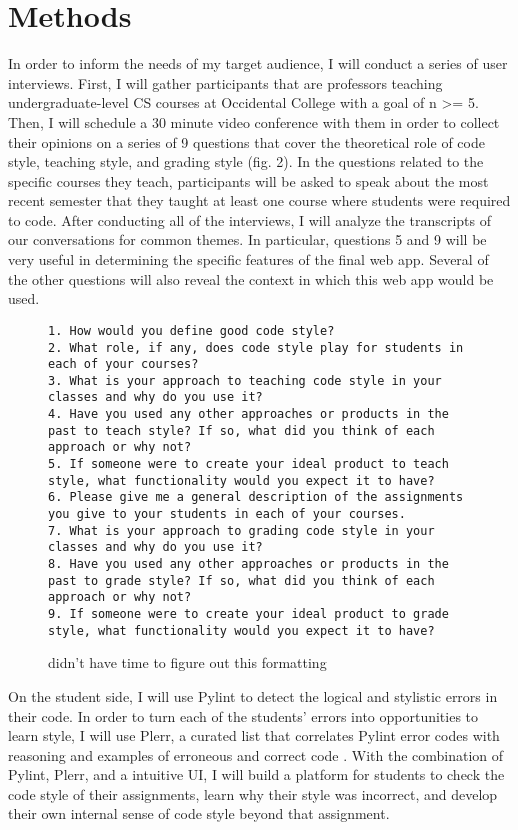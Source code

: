 \documentclass[10pt,twocolumn]{article}
\begin{document}
\section{Methods}
In order to inform the needs of my target audience, I will conduct a series of user interviews. First, I will gather participants that are professors teaching undergraduate-level CS courses at Occidental College with a goal of n >= 5. Then, I will schedule a 30 minute video conference with them in order to collect their opinions on a series of 9 questions that cover the theoretical role of code style, teaching style, and grading style (fig. 2). In the questions related to the specific courses they teach, participants will be asked to speak about the most recent semester that they taught at least one course where students were required to code. After conducting all of the interviews, I will analyze the transcripts of our conversations for common themes. In particular, questions 5 and 9 will be very useful in determining the specific features of the final web app. Several of the other questions will also reveal the context in which this web app would be used.

\begin{figure}
\begin{lstlisting}
1. How would you define good code style?
2. What role, if any, does code style play for students in each of your courses?
3. What is your approach to teaching code style in your classes and why do you use it?
4. Have you used any other approaches or products in the past to teach style? If so, what did you think of each approach or why not?
5. If someone were to create your ideal product to teach style, what functionality would you expect it to have?
6. Please give me a general description of the assignments you give to your students in each of your courses.
7. What is your approach to grading code style in your classes and why do you use it?
8. Have you used any other approaches or products in the past to grade style? If so, what did you think of each approach or why not?
9. If someone were to create your ideal product to grade style, what functionality would you expect it to have?
\end{lstlisting}
	\centering
	\caption{didn't have time to figure out this formatting}
\end{figure}

On the student side, I will use Pylint to detect the logical and stylistic errors in their code. In order to turn each of the students’ errors into opportunities to learn style, I will use Plerr, a curated list that correlates Pylint error codes with reasoning and examples of erroneous and correct code \cite{plerr}. With the combination of Pylint, Plerr, and a intuitive UI, I will build a platform for students to check the code style of their assignments, learn why their style was incorrect, and develop their own internal sense of code style beyond that assignment. 
\end{document}
